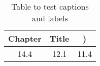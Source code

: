 \begin{table}[h!]
\centering
\begin{tabular}{ccc}
{Chapter} & {Title} & )} \\ 
\hline
{14.4} & {12.1} & {11.4} \\
\end{tabular}
\caption{Table to test captions and labels}
\label{table:1}
\end{table}